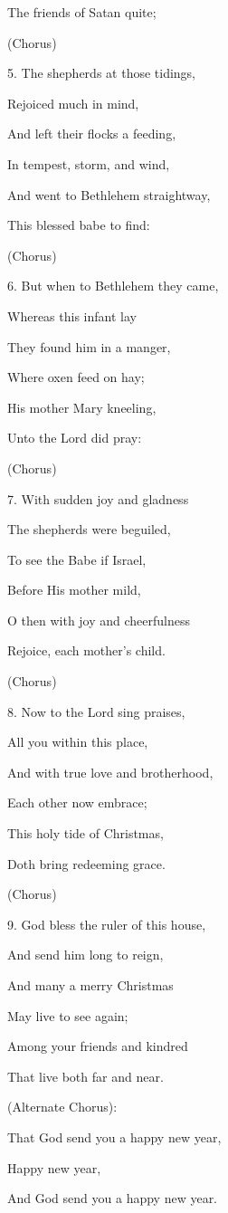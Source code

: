 \begin{description}[nosep,leftmargin=\parindent,labelsep=0pt]
\item The friends of Satan quite; 
\item (Chorus) 
\vspace{1.5ex}
\item 5. The shepherds at those tidings, 
\item Rejoiced much in mind, 
\item And left their flocks a feeding, 
\item In tempest, storm, and wind, 
\item And went to Bethlehem straightway, 
\item This blessed babe to find: 
\item (Chorus) 
\vspace{1.5ex}
\item 6. But when to Bethlehem they came, 
\item Whereas this infant lay 
\item They found him in a manger, 
\item Where oxen feed on hay; 
\item His mother Mary kneeling, 
\item Unto the Lord did pray: 
\item (Chorus) 
\vspace{1.5ex}
\item 7. With sudden joy and gladness 
\item The shepherds were beguiled, 
\item To see the Babe if Israel, 
\item Before His mother mild, 
\item O then with joy and cheerfulness 
\item Rejoice, each mother's child. 
\item (Chorus) 
\vspace{1.5ex}
\item 8. Now to the Lord sing praises, 
\item All you within this place, 
\item And with true love and brotherhood, 
\item Each other now embrace; 
\item This holy tide of Christmas, 
\item Doth bring redeeming grace. 
\item (Chorus) 
\vspace{1.5ex}
\item 9. God bless the ruler of this house, 
\item And send him long to reign, 
\item And many a merry Christmas 
\item May live to see again; 
\item Among your friends and kindred 
\item That live both far and near. 
\item (Alternate Chorus): 
\vspace{1.5ex}
\item That God send you a happy new year, 
\item Happy new year, 
\item And God send you a happy new year. 
\end{description}
